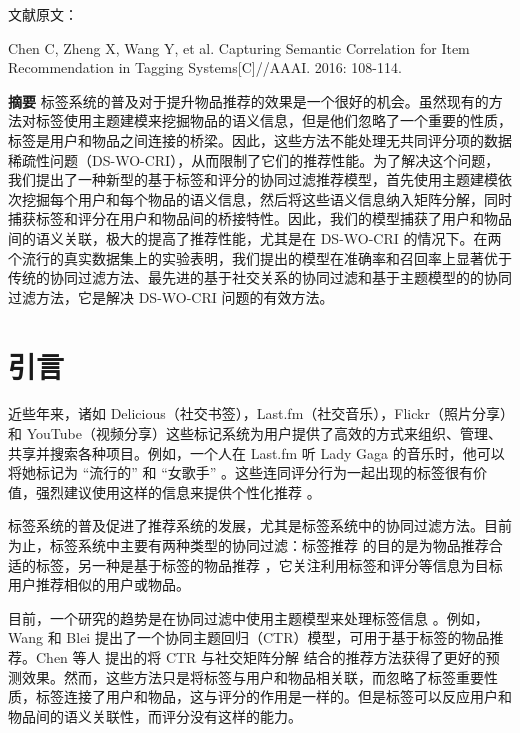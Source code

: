 
\centerline{\textbf{}}
\bigskip

\noindent 文献原文：

\noindent Chen C, Zheng X, Wang Y, et al. Capturing Semantic Correlation for Item Recommendation in Tagging Systems[C]//AAAI. 2016: 108-114.

\vspace{1cm}


\centerline{\textbf{}}

\vspace{10pt}

\textbf{摘要}\quad
标签系统的普及对于提升物品推荐的效果是一个很好的机会。虽然现有的方法对标签使用主题建模来挖掘物品的语义信息，但是他们忽略了一个重要的性质，标签是用户和物品之间连接的桥梁。因此，这些方法不能处理无共同评分项的数据稀疏性问题（DS-WO-CRI），从而限制了它们的推荐性能。为了解决这个问题，我们提出了一种新型的基于标签和评分的协同过滤推荐模型，首先使用主题建模依次挖掘每个用户和每个物品的语义信息，然后将这些语义信息纳入矩阵分解，同时捕获标签和评分在用户和物品间的桥接特性。因此，我们的模型捕获了用户和物品间的语义关联，极大的提高了推荐性能，尤其是在 DS-WO-CRI 的情况下。在两个流行的真实数据集上的实验表明，我们提出的模型在准确率和召回率上显著优于传统的协同过滤方法、最先进的基于社交关系的协同过滤和基于主题模型的的协同过滤方法，它是解决 DS-WO-CRI 问题的有效方法。

\chapter{引言}
近些年来，诸如 Delicious（社交书签），Last.fm（社交音乐），Flickr（照片分享）和 YouTube（视频分享）这些标记系统为用户提供了高效的方式来组织、管理、共享并搜索各种项目。例如，一个人在 Last.fm 听 Lady Gaga 的音乐时，他可以将她标记为 “流行的” 和 “女歌手” 。这些连同评分行为一起出现的标签很有价值，强烈建议使用这样的信息来提供个性化推荐 \cite{Zheng2011A} 。

标签系统的普及促进了推荐系统的发展，尤其是标签系统中的协同过滤方法。目前为止，标签系统中主要有两种类型的协同过滤：标签推荐 \cite{Wang2013Collaborative} 的目的是为物品推荐合适的标签，另一种是基于标签的物品推荐 \cite{Zhou2009TagRec,Zhou2010UserRec}，它关注利用标签和评分等信息为目标用户推荐相似的用户或物品。

目前，一个研究的趋势是在协同过滤中使用主题模型来处理标签信息 \cite{Agarwal2010fLDA,Wang2011Collaborative,purushotham2012collaborative,Wang2013Collaborative,Chen2014Context}。例如，Wang 和 Blei \cite{Wang2011Collaborative} 提出了一个协同主题回归（CTR）模型，可用于基于标签的物品推荐。Chen 等人 \cite{Chen2014Context} 提出的将 CTR 与社交矩阵分解 \cite{Ma2011Recommender} 结合的推荐方法获得了更好的预测效果。然而，这些方法只是将标签与用户和物品相关联，而忽略了标签重要性质，标签连接了用户和物品，这与评分的作用是一样的。但是标签可以反应用户和物品间的语义关联性，而评分没有这样的能力。

